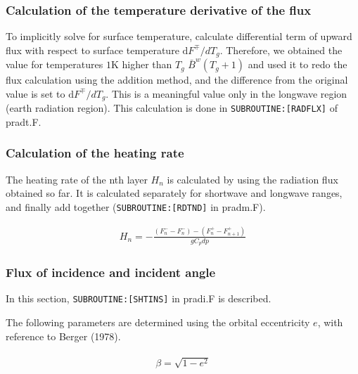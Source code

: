 \hypertarget{calculation-of-the-temperature-derivative-of-the-flux}{%
\subsubsection{Calculation of the temperature derivative of the
flux}\label{calculation-of-the-temperature-derivative-of-the-flux}}

To implicitly solve for surface temperature, calculate differential term
of upward flux with respect to surface temperature
\(\mathrm{d}F^{\mp}/dT_{g}\). Therefore, we obtained the value for
temperatures \(1\text{K}\) higher than \(T_g\)
\(\bar{B}^{w}\left(T_{g}+1\right)\) and used it to redo the flux
calculation using the addition method, and the difference from the
original value is set to \(\mathrm{d}F^{\mp}/dT_{g}\). This is a
meaningful value only in the longwave region (earth radiation region).
This calculation is done in \texttt{SUBROUTINE:{[}RADFLX{]}} of pradt.F.

\hypertarget{calculation-of-the-heating-rate}{%
\subsubsection{Calculation of the heating
rate}\label{calculation-of-the-heating-rate}}

The heating rate of the nth layer \(H_n\) is calculated by using the
radiation flux obtained so far. It is calculated separately for
shortwave and longwave ranges, and finally add together
(\texttt{SUBROUTINE:{[}RDTND{]}} in pradm.F).

\begin{eqnarray}
H_{n}=-\frac{\left(F_{n}^{-}-F_{n}^{-}\right)-\left(F_{n}^{+}-F_{n+1}^{+}\right)}{g C_{p} d p}
\end{eqnarray}

\hypertarget{flux-of-incidence-and-incident-angle}{%
\subsubsection{Flux of incidence and incident
angle}\label{flux-of-incidence-and-incident-angle}}

In this section, \texttt{SUBROUTINE:{[}SHTINS{]}} in pradi.F is
described.

The following parameters are determined using the orbital eccentricity
\(e\), with reference to Berger (1978).

\begin{eqnarray}
\begin{array}{l}
\beta=\sqrt{1-e^{2}}
\end{array}
\end{eqnarray}

